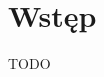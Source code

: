 \documentclass[00_main.tex]{subfiles}
\begin{document}
\pagestyle{headings}

\section*{Wstęp}

TODO
\end{document}
